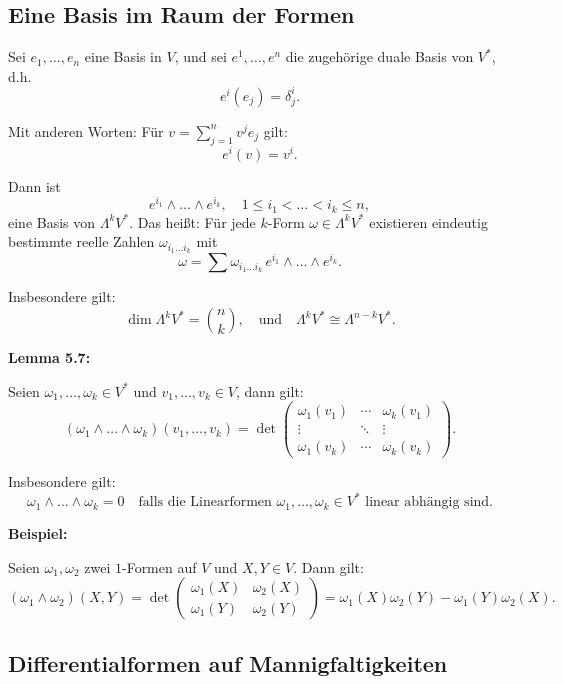 \documentclass[fleqn, 12pt, letterpaper]{article}
\begin{document}
\subsection{Eine Basis im Raum der Formen}

Sei \( e_1, \dots, e_n \) eine Basis in \( V \), und sei \( e^1, \dots, e^n \) die zugehörige duale Basis von \( V^* \), d.h.
\[
e^i(e_j) = \delta^i_j.
\]

Mit anderen Worten: Für \( v = \sum_{j=1}^n v^j e_j \) gilt:
\[
e^i(v) = v^i.
\]

Dann ist
\[
e^{i_1} \wedge \dots \wedge e^{i_k}, \quad 1 \leq i_1 < \dots < i_k \leq n,
\]
eine Basis von \( \Lambda^k V^* \). Das heißt: Für jede \( k \)-Form \( \omega \in \Lambda^k V^* \) existieren eindeutig bestimmte reelle Zahlen \( \omega_{i_1 \dots i_k} \) mit
\[
\omega = \sum \omega_{i_1 \dots i_k} \, e^{i_1} \wedge \dots \wedge e^{i_k}.
\]

Insbesondere gilt:
\[
\dim \Lambda^k V^* = \binom{n}{k}, \quad \text{und} \quad \Lambda^k V^* \cong \Lambda^{n-k}V^*.
\]

\textbf{Lemma 5.7:}

Seien \( \omega_1, \dots, \omega_k \in V^* \) und \( v_1, \dots, v_k \in V \), dann gilt:
\[
(\omega_1 \wedge \dots \wedge \omega_k)(v_1, \dots, v_k)
= \det \begin{pmatrix}
\omega_1(v_1) & \cdots & \omega_k(v_1) \\
\vdots & \ddots & \vdots \\
\omega_1(v_k) & \cdots & \omega_k(v_k)
\end{pmatrix}.
\]

Insbesondere gilt:
\[
\omega_1 \wedge \dots \wedge \omega_k = 0 \quad \text{falls die Linearformen } \omega_1, \dots, \omega_k \in V^* \text{ linear abhängig sind}.
\]

\textbf{Beispiel:}

Seien \( \omega_1, \omega_2 \) zwei \(1\)-Formen auf \( V \) und \( X, Y \in V \). Dann gilt:
\[
(\omega_1 \wedge \omega_2)(X, Y)
= \det \begin{pmatrix}
\omega_1(X) & \omega_2(X) \\
\omega_1(Y) & \omega_2(Y)
\end{pmatrix}
= \omega_1(X)\omega_2(Y) - \omega_1(Y)\omega_2(X).
\]

\subsection{Differentialformen auf Mannigfaltigkeiten}
\end{document}
